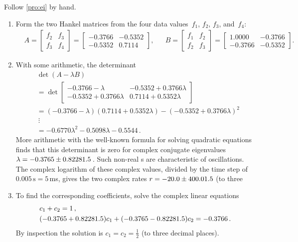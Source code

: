 \begin{example}
\begin{solution} 
Follow \cref{pro:ei} by hand. 
\begin{enumerate}
\item 
Form the two Hankel matrices from the four data values~\(f_1\), \(f_2\), \(f_3\), and~\(f_4\):
\begin{align*}&
A=\begin{bmatrix} f_2&f_3\\f_3&f_4 \end{bmatrix}
=\begin{bmatrix} -0.3766 & -0.5352
\\  -0.5352&   0.7114 \end{bmatrix},
&&
B=\begin{bmatrix} f_1&f_2\\f_2&f_3 \end{bmatrix}
=\begin{bmatrix} 1.0000&  -0.3766
\\  -0.3766&  -0.5352 \end{bmatrix}.
\end{align*}
\item 
With some arithmetic, the determinant 
\begin{align*}
&\det(A-\lambda B)
\\&=\det\begin{bmatrix} -0.3766-\lambda & -0.5352+0.3766\lambda
\\  -0.5352+0.3766\lambda&   0.7114+0.5352\lambda \end{bmatrix} 
\\&=(-0.3766-\lambda)(0.7114+0.5352\lambda)
-(-0.5352+0.3766\lambda)^2
\\&\ \vdots 
\\&= -0.6770\lambda^2  -0.5098\lambda  -0.5544\,.
\end{align*}
More arithmetic with the well-known formula for solving quadratic equations finds that this determinant is zero for complex conjugate eigenvalues \(\lambda=-0.3765 \pm 0.82281.5\)\,.
Such non-real s are characteristic of oscillations.
The complex logarithm of these complex values, divided by the time step of \(0.005\,\text{s}=5\,\)ms, gives the two complex rates \(r=-20.0\pm400.01.5\) (to three 
\item 
To find the corresponding coefficients, solve the complex linear equations
\begin{align*}&
c_1+c_2=1\,, 
\\&
(-0.3765 + 0.82281.5)c_1+(-0.3765 - 0.82281.5)c_2
=-0.3766\,.
\end{align*}
By inspection the solution is \(c_1=c_2=\tfrac12\) (to three decimal places).
\end{enumerate}


\end{solution}
\end{example}
